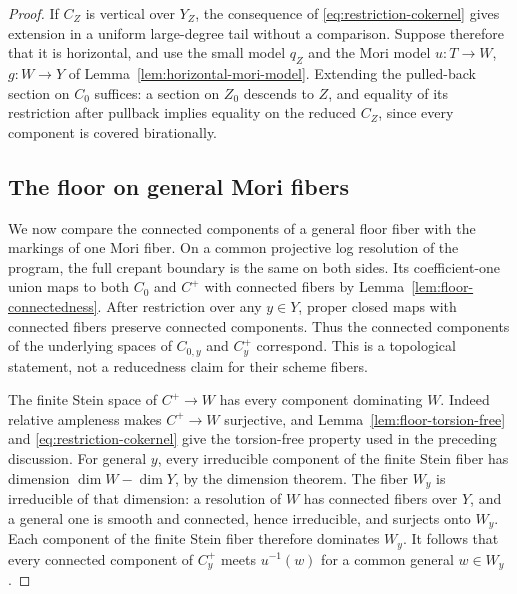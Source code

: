 \begin{proof}
If \(C_Z\) is vertical over \(Y_Z\), the consequence of
\eqref{eq:restriction-cokernel} gives extension in a uniform large-degree
tail without a comparison.  Suppose therefore that it is horizontal,
and use the small model \(q_Z\) and the Mori model
\(u:T\to W\), \(g:W\to Y\) of Lemma~\ref{lem:horizontal-mori-model}.
Extending the pulled-back section on \(C_0\) suffices: a section on
\(Z_0\) descends to \(Z\), and equality of its restriction after
pullback implies equality on the reduced \(C_Z\), since every component
is covered birationally.

\subsection*{The floor on general Mori fibers}

We now compare the connected components of a general floor fiber with
the markings of one Mori fiber.  On a common projective log resolution
of the program, the full crepant boundary is the same on both sides.
Its coefficient-one union maps to both \(C_0\) and \(C^+\) with connected
fibers by Lemma~\ref{lem:floor-connectedness}.  After restriction over
any \(y\in Y\), proper closed maps with connected fibers preserve
connected components.  Thus the connected components of the underlying
spaces of \(C_{0,y}\) and \(C^+_y\) correspond.  This is a topological
statement, not a reducedness claim for their scheme fibers.

The finite Stein space of \(C^+\to W\) has every component dominating
\(W\).  Indeed relative ampleness makes \(C^+\to W\) surjective, and
Lemma~\ref{lem:floor-torsion-free} and
\eqref{eq:restriction-cokernel} give the torsion-free property used in
the preceding discussion.  For general \(y\), every irreducible component
of the finite Stein fiber has dimension \(\dim W-\dim Y\), by the
dimension theorem.  The fiber \(W_y\) is irreducible of that dimension:
a resolution of \(W\) has connected fibers over \(Y\), and a general
one is smooth and connected, hence irreducible, and surjects onto \(W_y\).
Each component of the finite Stein fiber therefore dominates \(W_y\).
It follows that every connected component of \(C^+_y\) meets
\(u^{-1}(w)\) for a common general \(w\in W_y\).


\end{proof}
